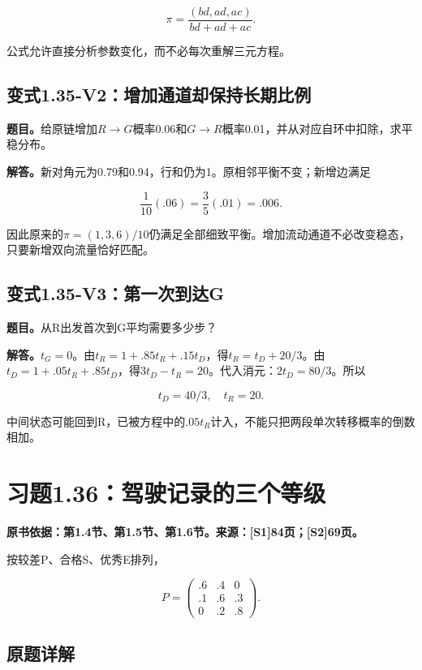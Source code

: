 \documentclass[
  11pt,
  a4paper,
  UTF8,
  fontset=fandol]{ctexart}
\begin{document}
\[
\boxed{\pi=\frac{(bd,ad,ac)}{bd+ad+ac}.}
\]

公式允许直接分析参数变化，而不必每次重解三元方程。

\subsection{变式1.35-V2：增加通道却保持长期比例}\label{ux53d8ux5f0f1.35-v2ux589eux52a0ux901aux9053ux5374ux4fddux6301ux957fux671fux6bd4ux4f8b}

\textbf{题目。}给原链增加\(R\to G\)概率0.06和\(G\to R\)概率0.01，并从对应自环中扣除，求平稳分布。

\textbf{解答。}新对角元为0.79和0.94，行和仍为1。原相邻平衡不变；新增边满足

\[
\frac1{10}(.06)=\frac35(.01)=.006.
\]

因此原来的\(\pi=(1,3,6)/10\)仍满足全部细致平衡。增加流动通道不必改变稳态，只要新增双向流量恰好匹配。

\subsection{变式1.35-V3：第一次到达G}\label{ux53d8ux5f0f1.35-v3ux7b2cux4e00ux6b21ux5230ux8fbeg}

\textbf{题目。}从R出发首次到G平均需要多少步？

\textbf{解答。}\(t_G=0\)。由\(t_R=1+.85t_R+.15t_D\)，得\(t_R=t_D+20/3\)。由\(t_D=1+.05t_R+.85t_D\)，得\(3t_D-t_R=20\)。代入消元：\(2t_D=80/3\)。所以

\[
\boxed{t_D=40/3,\quad t_R=20.}
\]

中间状态可能回到R，已被方程中的\(.05t_R\)计入，不能只把两段单次转移概率的倒数相加。

\section{习题1.36：驾驶记录的三个等级}\label{ux4e60ux98981.36ux9a7eux9a76ux8bb0ux5f55ux7684ux4e09ux4e2aux7b49ux7ea7}

\textbf{原书依据：第1.4节、第1.5节、第1.6节。来源：{[}S1{]}84页；{[}S2{]}69页。}

按较差P、合格S、优秀E排列，

\[
P=\begin{pmatrix}.6&.4&0\\.1&.6&.3\\0&.2&.8\end{pmatrix}.
\]

\subsection{原题详解}\label{ux539fux9898ux8be6ux89e3-6}
\end{document}
